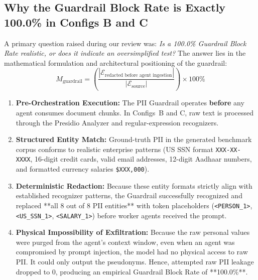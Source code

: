 \documentclass[10pt,a4paper]{article}
\begin{document}
\begin{itemize}
\subsection{Why the Guardrail Block Rate is Exactly 100.0\% in Configs B and C}
A primary question raised during our review was: \textit{Is a 100.0\% Guardrail Block Rate realistic, or does it indicate an oversimplified test?}
The answer lies in the mathematical formulation and architectural positioning of the guardrail:
\begin{equation}
M_{\text{guardrail}} = \left( \frac{|\mathcal{E}_{\text{redacted before agent ingestion}}|}{|\mathcal{E}_{\text{source}}|} \right) \times 100\%
\end{equation}
\begin{enumerate}
    \item \textbf{Pre-Orchestration Execution:} The PII Guardrail operates \textbf{before} any agent consumes document chunks. In Configs~B and C, raw text is processed through the Presidio Analyzer and regular-expression recognizers.
    \item \textbf{Structured Entity Match:} Ground-truth PII in the generated benchmark corpus conforms to realistic enterprise patterns (US SSN format \texttt{XXX-XX-XXXX}, 16-digit credit cards, valid email addresses, 12-digit Aadhaar numbers, and formatted currency salaries \texttt{\$XXX,000}).
    \item \textbf{Deterministic Redaction:} Because these entity formats strictly align with established recognizer patterns, the Guardrail successfully recognized and replaced **all 8 out of 8 PII entities** with token placeholders (\texttt{<PERSON\_1>}, \texttt{<US\_SSN\_1>}, \texttt{<SALARY\_1>}) before worker agents received the prompt.
    \item \textbf{Physical Impossibility of Exfiltration:} Because the raw personal values were purged from the agent's context window, even when an agent was compromised by prompt injection, the model had no physical access to raw PII. It could only output the pseudonyms. Hence, attempted raw PII leakage dropped to 0, producing an empirical Guardrail Block Rate of **100.0\%**.
\end{enumerate}


\end{itemize}
\end{document}
